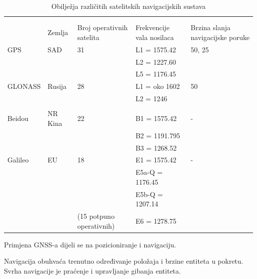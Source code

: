 \documentclass[a4paper,twoside,12pt]{memoir} %
\begin{document}
\begin{intro}
	\begin{table}[H]
		\caption{Obilježja različitih satelitskih navigacijskih sustava}
		\begin{center}
			\begin{tabular}{|lllll|}
				\hline
				\rowcolor{lightgray}&  &  & &  \\
				\rowcolor{lightgray}&  &  & &  \\
				 \multirow{-3}{1cm}{ \cellcolor{lightgray}	} & \multirow{-3}{2cm}{\cellcolor{lightgray} Zemlja} & 
				 \multirow{-3}{2cm}{ \cellcolor{lightgray}Broj operativnih satelita} & \multirow{-3}{3cm}{\cellcolor{lightgray} Frekvencije vala nosilaca} & \multirow{-3}{3cm}{\cellcolor{lightgray} Brzina slanja navigacijske poruke} \\
				\hline\hline
				GPS & SAD & 31 & {L1 = 1575.42}
				& 50, 25 \\
				 &  &  & L2 = 1227.60 &  \\
				 &  &  & L5 = 1176.45 &  \\
				\hline
				GLONASS & Rusija & 28 & {L1 = oko 1602}
				& 50 \\
				 &  &  & L2 = 1246 &  \\
				 &  &  &&  \\
				\hline
				Beidou & NR Kina & 22 & {B1 = 1575.42}
				& - \\
				&  &  & B2 = 1191.795 &  \\
				&  &  & B3 = 1268.52 &  \\
				\hline
				Galileo & EU & 18 & {E1 = 1575.42}
				& - \\
				&  &  & E5a-Q = 1176.45 &  \\
				&  &  & E5b-Q = 1207.14 &  \\
				&  & \multirow{-3}{2.5cm}{(15 potpuno operativnih)} & E6 = 1278.75 &  \\
				\hline
			\end{tabular}
		\end{center}
		\label{tab:multicol}
	\end{table}
	
	Primjena GNSS-a dijeli se na pozicioniranje i navigaciju.
	\begin{defn}[Navigacija]
		Navigacija obuhvaća trenutno određivanje položaja i brzine entiteta u pokretu.
		Svrha navigacije je praćenje i upravljanje gibanja entiteta.
	\end{defn}
	

\end{intro}
\end{document}
